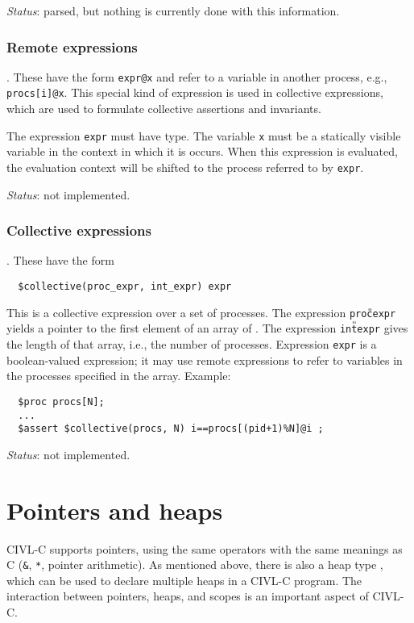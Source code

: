 \documentclass[11pt]{book}
\begin{document}
\emph{Status}: parsed, but nothing is currently done with this
information.

\subsection{Remote expressions}.  These have the form \verb!expr@x!
and refer to a variable in another process, e.g., \verb!procs[i]@x!.
This special kind of expression is used in collective expressions,
which are used to formulate collective assertions and invariants.

The expression \verb!expr! must have \cproc{} type.  The variable
\texttt{x} must be a statically visible variable in the context in
which it is occurs.  When this expression is evaluated, the evaluation
context will be shifted to the process referred to by \texttt{expr}.

\emph{Status}: not implemented.

\subsection{Collective expressions}.  These have the form
\begin{verbatim}
  $collective(proc_expr, int_expr) expr 
\end{verbatim}
This is a collective expression over a set of processes.  The
expression \texttt{proc{\U}expr} yields a pointer to the first element
of an array of \cproc.  The expression \texttt{int{\U}expr} gives the
length of that array, i.e., the number of processes.  Expression
\texttt{expr} is a boolean-valued expression; it may use remote
expressions to refer to variables in the processes specified in the
array.  Example:
\begin{verbatim}
  $proc procs[N];
  ...
  $assert $collective(procs, N) i==procs[(pid+1)%N]@i ;
\end{verbatim}

\emph{Status}: not implemented.

\chapter{Pointers and heaps}

CIVL-C supports pointers, using the same operators with the same
meanings as C (\texttt{\&}, \texttt{*}, pointer arithmetic).
As mentioned above, there is also a heap type \cheap{}, which can
be used to declare multiple heaps in a CIVL-C program.  The
interaction between pointers, heaps, and scopes is an important
aspect of CIVL-C.
\end{document}
